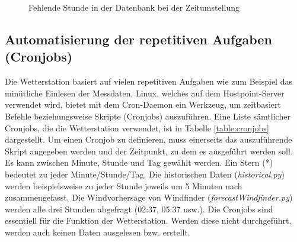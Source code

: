 \begin{figure}[htbp!]
	\centering
	\caption{Fehlende Stunde in der Datenbank bei der Zeitumstellung}
	\label{img:sommerzeit}
\end{figure}


\subsection{Automatisierung der repetitiven Aufgaben (Cronjobs)}
Die Wetterstation basiert auf vielen repetitiven Aufgaben wie zum Beispiel das minütliche Einlesen der Messdaten. Linux, welches auf dem Hostpoint-Server verwendet wird, bietet mit dem Cron-Daemon ein Werkzeug, um zeitbasiert Befehle beziehungsweise Skripte (Cronjobs) auszuführen. Eine Liste sämtlicher Cronjobs, die die Wetterstation verwendet, ist in Tabelle \ref{table:cronjobs} dargestellt. Um einen Cronjob zu definieren, muss einerseits das auszuführende Skript angegeben werden und der Zeitpunkt, zu dem es ausgeführt werden soll. Es kann zwischen Minute, Stunde und Tag gewählt werden. Ein Stern (*) bedeutet zu jeder Minute/Stunde/Tag. Die historischen Daten (\emph{historical.py}) werden beispielsweise zu jeder Stunde jeweils um 5 Minuten nach zusammengefasst. Die Windvorhersage von Windfinder (\emph{forecastWindfinder.py}) werden alle drei Stunden abgefragt (02:37, 05:37 usw.). Die Cronjobs sind essentiell für die Funktion der Wetterstation. Werden diese nicht durchgeführt, werden auch keinen Daten ausgelesen bzw. erstellt.

